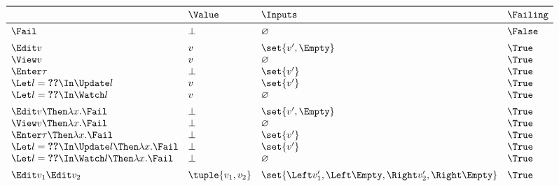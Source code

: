 \begin{equation*}
  \begin{array}{llll}
    \toprule
                                                         & \Value           & \Inputs                                                    & \Failing \\
    \midrule
    \Fail                                                & \bot             & \nothing                                                   & \False \\
    \addlinespace
    \Edit v                                              & v                & \set{v', \Empty}                                           & \True \\
    \View v                                              & v                & \nothing                                                   & \True \\
    \Enter \tau                                          & \bot             & \set{v'}                                                   & \True \\
    \Let l = \Ref v \In \Update l                        & v                & \set{v'}                                                   & \True \\
    \Let l = \Ref v \In \Watch l                         & v                & \nothing                                                   & \True \\
    \addlinespace
    \Edit v \Then \lambda x. \Fail                       & \bot             & \set{v', \Empty}                                           & \True \\
    \View v \Then \lambda x. \Fail                       & \bot             & \nothing                                                   & \True \\
    \Enter \tau \Then \lambda x. \Fail                   & \bot             & \set{v'}                                                   & \True \\
    \Let l = \Ref v \In \Update l \Then \lambda x. \Fail & \bot             & \set{v'}                                                   & \True \\
    \Let l = \Ref v \In \Watch l \Then \lambda x. \Fail  & \bot             & \nothing                                                   & \True \\
    \addlinespace
    \Edit v_1 \And \Edit v_2                             & \tuple{v_1, v_2} & \set{\Left v_1', \Left \Empty, \Right v_2', \Right \Empty} & \True \\

\end{array}
\end{equation*}

